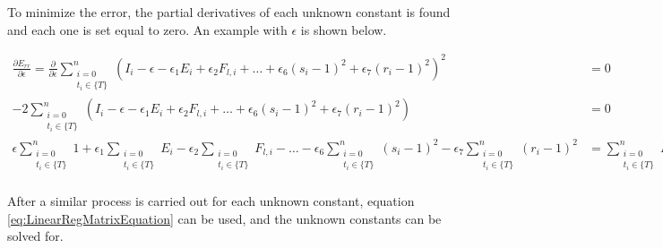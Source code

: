 To minimize the error, the partial derivatives of each unknown constant is found and each one is set equal to zero. An example with $\epsilon$ is shown below.

\begin{equation*}
    \begin{split}
        \frac{\partial E_{rr}}{\partial \epsilon}=
        \frac{\partial}{\partial \epsilon}\sum_{
                \substack{i=0\\ t_i\in \{ T \}}
            }^n \left(
            I_i
            -\epsilon
            -\epsilon_1 E_i
            +\epsilon_2 F_{l,i}
            +\dots
            +\epsilon_6 (s_i-1)^2
            +\epsilon_7 (r_i-1)^2
        \right)^2&=0\\
        -2\sum_{
                \substack{i=0\\ t_i\in \{ T \}}
            }^n \left(
            I_i
            -\epsilon
            -\epsilon_1 E_i
            +\epsilon_2 F_{l,i}
            +\dots
            +\epsilon_6(s_i-1)^2
            +\epsilon_7(r_i-1)^2
        \right)&=0\\
        \epsilon \sum_{\substack{i=0\\ t_i\in \{ T \}}}^n 1 
        +\epsilon_1 \sum_{\substack{i=0\\ t_i\in \{ T \}}} E_i
        -\epsilon_2 \sum_{\substack{i=0\\ t_i\in \{ T \}}} F_{l,i}
        -\dots
        -\epsilon_6 \sum_{\substack{i=0\\ t_i\in \{ T \}}}^n (s_i-1)^2
        -\epsilon_7 \sum_{\substack{i=0\\ t_i\in \{ T \}}}^n (r_i-1)^2
        &=
        \sum_{\substack{i=0\\ t_i\in \{ T \}}}^n I_i\\
    \end{split}
\end{equation*}

After a similar process is carried out for each unknown constant, equation \ref{eq:LinearRegMatrixEquation} can be used, and the unknown constants can be solved for.

